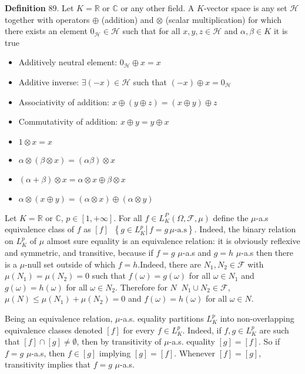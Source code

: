 \documentclass[a4paper]{article}
\newcommand{\obj}[1]{\left\{ #1 \right \}}
\newcommand{\clo}[1]{\left [ #1 \right ]}
\newcommand{\brac}[1]{\left ( #1 \right )}
\newcommand{\induc}[1]{\left . #1 \right \vert}
\newcommand{\Real}{\mathbb{R}}
\newcommand{\Cplx}{\mathbb{C}}
\newcommand{\Hcal}{\mathcal{H}}
\newcommand{\Fcal}{\mathcal{F}}
\newcommand{\defn}{\mathop{\overset{\Delta}{=}}\nolimits}
\begin{document}
\noindent \textbf{Definition} 89.
Let $K=\Real$ or $\Cplx$ or any other field. A $K$-vector space is any set $\Hcal$ together with operators $\oplus$ (addition) and $\otimes$ (scalar multiplication) for which there exists an element $0_\Hcal\in \Hcal$ such that for all $x,y,z\in \Hcal$ and $\alpha, \beta\in K$ it is true \begin{itemize}
	\item Additively neutral element: $0_\Hcal \oplus x = x$
	\item Additive inverse: $\exists \brac{-x}\in \Hcal$ such that $\brac{-x} \oplus x = 0_\Hcal$
	\item Associativity of addition: $x\oplus \brac{y\oplus z} = \brac{x\oplus y}\oplus z$
	\item Commutativity of addition: $x\oplus y = y\oplus x$
	\item $1 \otimes x = x$
	\item $\alpha \otimes \brac{\beta \otimes x} = \brac{\alpha \beta} \otimes x$
	\item $\brac{\alpha + \beta} \otimes x = \alpha \otimes x \oplus \beta \otimes x$
	\item $\alpha \otimes \brac{x\oplus y} = \brac{\alpha \otimes x} \oplus \brac{\alpha \otimes y}$
\end{itemize}

Let $K=\Real$ or $\Cplx$, $p\in \clo{1,+\infty}$. For all $f\in L^P_K\brac{\Omega, \Fcal, \mu}$ define the $\mu$-a.s equivalence class of $f$ as $\clo{f}\defn \obj{\induc{g\in L^p_K}\, f=g\, \mu\text{-a.s}}$. Indeed, the binary relation on $L^p_K$ of $\mu$ almost sure equality is an equivalence relation: it is obviously reflexive and symmetric, and transitive, because if $f=g$ $\mu$-a.s and $g=h$ $\mu$-a.s then there is a $\mu$-null set outside of which $f=h$.Indeed, there are $N_1,N_2\in \Fcal$ with $\mu\brac{N_1}=\mu\brac{N_2}=0$ such that $f\brac{\omega}=g\brac{\omega}$ for all $\omega\in N_1$ and $g\brac{\omega}=h\brac{\omega}$ for all $\omega\in N_2$. Therefore for $N\defn N_1\cup N_2\in \Fcal$, $\mu\brac{N}\leq \mu\brac{N_1}+\mu\brac{N_2}=0$ and $f\brac{\omega}=h\brac{\omega}$ for all $\omega\in N$.

Being an equivalence relation, $\mu$-a.s. equality partitions $L^p_K$ into non-overlapping equivalence classes denoted $\clo{f}$ for every $f\in L^p_K$. Indeed, if $f,g\in L^p_K$ are such that $\clo{f}\cap \clo{g}\neq \emptyset$, then by transitivity of $\mu$-a.s. equality $\clo{g}=\clo{f}$. So if $f=g$ $\mu$-a.s, then $f\in \clo{g}$ implying $\clo{g}=\clo{f}$. Whenever $\clo{f}=\clo{g}$, transitivity implies that $f=g$ $\mu$-a.s.
\end{document}
